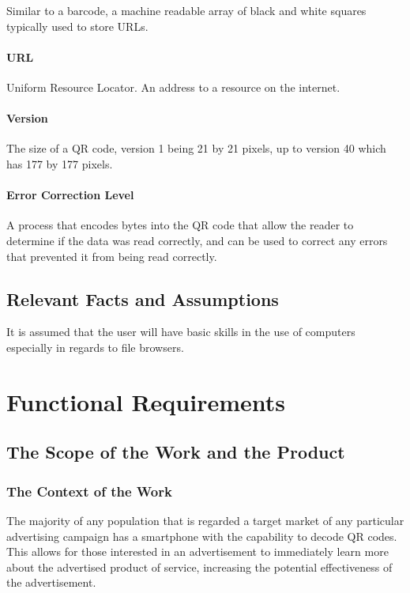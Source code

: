 \documentclass[12pt, titlepage]{article}
\begin{document}
			 Similar to a barcode, a machine readable array of black 
			and white squares typically used to store URLs.
			\paragraph{URL}
			 Uniform Resource Locator. An address to a resource on the 
			internet.
			\paragraph{Version}
			 The size of a QR code, version 1 being 21 by 21 pixels, up 
			to version 40 which has 177 by 177 pixels.
			\paragraph{Error Correction Level}
			 A process that encodes bytes into the QR 
			code that allow the reader to determine if the data was read 
			correctly, and can be used to correct any errors that prevented it 
			from being read correctly.

\subsection{Relevant Facts and Assumptions}

	It is assumed that the user will have basic skills in the use of computers 
	especially in regards to file browsers.

\section{Functional Requirements}

\subsection{The Scope of the Work and the Product}

\subsubsection{The Context of the Work}
	
	The majority of any population that is regarded a target market of any 
	particular advertising campaign has a smartphone with the capability to 
	decode QR codes. This allows for those interested in an advertisement to 
	immediately learn more about the advertised product of service, increasing 
	the potential effectiveness of the advertisement.
	
\end{document}
